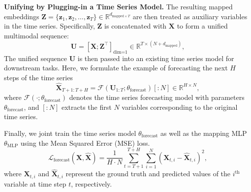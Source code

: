 \textbf{Unifying by Plugging-in a Time Series Model.}
The resulting mapped embeddings $\bm{Z} = \{\bm{z}_1, \bm{z}_2, \dots, \bm{z}_T\} \in \mathbb{R}^{d_{\text{mapped} \times T}}$ are then treated as auxiliary variables in the time series. Specifically, $\bm{Z}$ is concatenated with $\bm{X}$ to form a unified multimodal sequence:  
\begin{equation}
\label{eq: compute u}
\bm{U} = [\bm{X}; \bm{Z}^{\intercal}]_{\text{dim=1}} \in \mathbb{R}^{T \times (N + d_{\text{mapped}})},
\end{equation}
The unified sequence $\bm{U}$ is then passed into an existing time series model for downstream tasks. Here, we formulate the example of forecasting the next $H$ steps of the time series
\begin{equation}
    \widehat{\mathbf{X}}_{T+1: T+H} = \mathcal{F}\left(\mathbf{U}_{1: T}; \theta_{\text{forecast}}\right)[:N] \in \mathbb{R}^{H \times N},
\end{equation}
where $\mathcal{F}(\cdot; \theta_{\text{forecast}})$ denotes the time series forecasting model with parameters $\theta_{\text{forecast}}$, and $[:N]$ extracts the first $N$ variables corresponding to the original time series.

Finally, we joint train the time series model $\theta_{\text{forecast}}$ as well as the mapping MLP $\theta_{\text{MLP}}$ using the Mean Squared Error (MSE) loss.
\begin{equation}
\label{eq: training mse loss}
\mathcal{L}_{\text{forecast}}(\bm{X}, \widehat{\mathbf{X}}) = \frac{1}{H \cdot N} \sum_{t=T+1}^{T+H} \sum_{i=1}^{N} \left(\mathbf{X}_{t, i} - \widehat{\mathbf{X}}_{t, i}\right)^2,
\end{equation}
where $\mathbf{X}_{t, i}$ and $\widehat{\mathbf{X}}_{t, i}$ represent the ground truth and predicted values of the $i^{\textrm{th}}$ variable at time step $t$, respectively.
